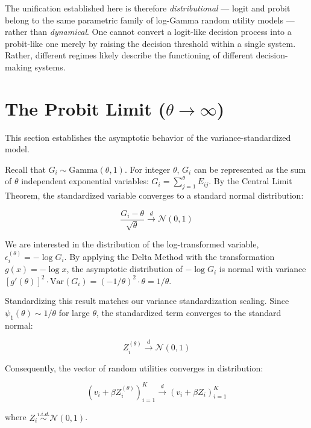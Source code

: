 \documentclass[
  man,
  floatsintext,
  longtable,
  a4paper,
  nolmodern,
  notxfonts,
  notimes,
  colorlinks=true,linkcolor=blue,citecolor=blue,urlcolor=blue]{apa7}
\begin{document}
The unification established here is therefore \emph{distributional} ---
logit and probit belong to the same parametric family of log-Gamma
random utility models --- rather than \emph{dynamical}. One cannot
convert a logit-like decision process into a probit-like one merely by
raising the decision threshold within a single system. Rather, different
regimes likely describe the functioning of different decision-making
systems.

\section{\texorpdfstring{The Probit Limit
(\(\theta \to \infty\))}{The Probit Limit (\textbackslash theta \textbackslash to \textbackslash infty)}}\label{sec-probit-limit}

This section establishes the asymptotic behavior of the
variance-standardized model.

Recall that \(G_i \sim \text{Gamma}(\theta, 1)\). For integer
\(\theta\), \(G_i\) can be represented as the sum of \(\theta\)
independent exponential variables: \(G_i = \sum_{j=1}^{\theta} E_{ij}\).
By the Central Limit Theorem, the standardized variable converges to a
standard normal distribution:

\[
\frac{G_i - \theta}{\sqrt{\theta}} \xrightarrow{d} \mathcal{N}(0, 1)
\]

We are interested in the distribution of the log-transformed variable,
\(\epsilon_i^{(\theta)} = -\log G_i\). By applying the Delta Method with
the transformation \(g(x) = -\log x\), the asymptotic distribution of
\(-\log G_i\) is normal with variance
\([g'(\theta)]^2 \cdot \text{Var}(G_i) = (-1/\theta)^2 \cdot \theta = 1/\theta\).

Standardizing this result matches our variance standardization scaling.
Since \(\psi_1(\theta) \sim 1/\theta\) for large \(\theta\), the
standardized term converges to the standard normal:

\[
Z_i^{(\theta)} \xrightarrow{d} \mathcal{N}(0, 1)
\]

Consequently, the vector of random utilities converges in distribution:

\[
(v_i + \beta Z_i^{(\theta)})_{i=1}^K \xrightarrow{d} (v_i + \beta Z_i)_{i=1}^K
\]

where \(Z_i \stackrel{i.i.d.}{\sim} \mathcal{N}(0, 1)\).
\end{document}
